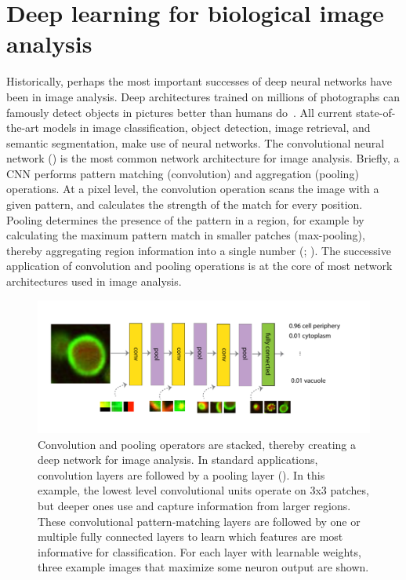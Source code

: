 \section{Deep learning for biological image analysis}

Historically, perhaps the most important successes of deep neural networks have been in image analysis. Deep architectures trained on millions of photographs can famously detect objects in pictures better than humans do~\citep{he_deep_2015}. All current state-of-the-art models in image classification, object detection, image retrieval, and semantic segmentation, make use of neural networks. The convolutional neural network () is the most common network architecture for image analysis. Briefly, a CNN performs pattern matching (convolution) and aggregation (pooling) operations. At a pixel level, the convolution operation scans the image with a given pattern, and calculates the strength of the match for every position. Pooling determines the presence of the pattern in a region, for example by calculating the maximum pattern match in smaller patches (max-pooling), thereby aggregating region information into a single number (; ). The successive application of convolution and pooling operations is at the core of most network architectures used in image analysis.

\begin{figure}[htbp!]
\centering
\includegraphics[width=1.0\textwidth]{image}
\caption[Deep neural network for image analysis.]{Convolution and pooling operators are stacked, thereby creating a deep network for image analysis. In standard applications, convolution layers are followed by a pooling layer (). In this example, the lowest level convolutional units operate on 3x3 patches, but deeper ones use and capture information from larger regions. These convolutional pattern-matching layers are followed by one or multiple fully connected layers to learn which features are most informative for classification. For each layer with learnable weights, three example images that maximize some neuron output are shown.}
\label{fig:dl_image_cnn}
\end{figure}


